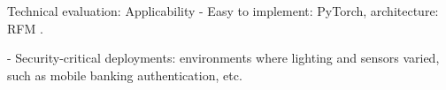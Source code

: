 \begin{frame}{Technical evaluation: Applicability}
- Easy to implement: PyTorch, architecture: RFM \cite{shao2020rfm}.

- Security-critical deployments: environments where lighting and sensors varied, such as mobile banking authentication, etc.
\end{frame}


